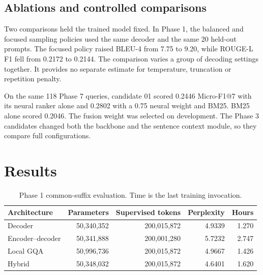 \documentclass[11pt, oneside]{article}
\begin{document}
\subsection{Ablations and controlled comparisons}

Two comparisons held the trained model fixed. In Phase 1, the balanced and focused sampling policies used the same decoder and the same 20 held-out prompts. The focused policy raised BLEU-4 from 7.75 to 9.20, while ROUGE-L F1 fell from 0.2172 to 0.2144. The comparison varies a group of decoding settings together. It provides no separate estimate for temperature, truncation or repetition penalty.

On the same 118 Phase 7 queries, candidate 01 scored 0.2446 Micro-F1@7 with its neural ranker alone and 0.2802 with a 0.75 neural weight and BM25. BM25 alone scored 0.2046. The fusion weight was selected on development. The Phase 3 candidates changed both the backbone and the sentence context module, so they compare full configurations.

\section{Results}

\begin{table}[H]
\centering\small
\caption{Phase 1 common-suffix evaluation. Time is the last training invocation.}
\begin{tabular}{@{}lrrrr@{}}
\toprule Architecture & Parameters & Supervised tokens & Perplexity & Hours \\ \midrule
Decoder & 50,340,352 & 200,015,872 & 4.9339 & 1.270 \\
Encoder--decoder & 50,341,888 & 200,001,280 & 5.7232 & 2.747 \\
Local GQA & 50,996,736 & 200,015,872 & 4.9667 & 1.426 \\
Hybrid & 50,348,032 & 200,015,872 & 4.6401 & 1.620 \\
\bottomrule
\end{tabular}
\end{table}
\end{document}
